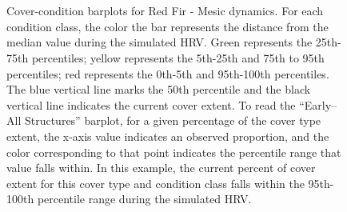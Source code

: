 \begin{figure}[!htbp]
  \\%
  \\%
    \\%
    \\%
    \\%
    \\%
    \\%
  \caption{Cover-condition barplots for Red Fir - Mesic dynamics. For each condition class, the color the bar represents the distance from the median value during the simulated HRV. Green represents the 25th-75th percentiles; yellow represents the 5th-25th and 75th to 95th percentiles; red represents the 0th-5th and 95th-100th percentiles. The blue vertical line marks the 50th percentile and the black vertical line indicates the current cover extent. To read the ``Early–All Structures'' barplot, for a given percentage of the cover type extent, the x-axis value indicates an observed proportion, and the color corresponding to that point indicates the percentile range that value falls within. In this example, the current percent of cover extent for this cover type and condition class falls within the 95th-100th percentile range during the simulated HRV.}
  \label{fig:covcondbar_rfrm}
\end{figure}

